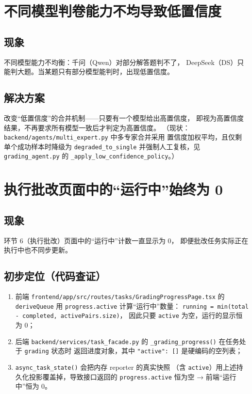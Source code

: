\documentclass[12pt,a4paper]{ctexart}
\begin{document}
\section{不同模型判卷能力不均导致低置信度}

\subsection{现象}
不同模型能力不均衡：千问（Qwen）对部分解答题判不了，
DeepSeek（DS）只能判大题。当某题只有部分模型能判时，出现低置信度。

\subsection{解决方案}
改变“低置信度”的合并机制——只要有一个模型给出高置信度，
即视为高置信度结果，不再要求所有模型一致后才判定为高置信度。
（现状：\texttt{backend/agents/multi\_expert.py} 中多专家合并采用
置信度加权平均，且仅剩单个成功样本时降级为
\texttt{degraded\_to\_single} 并强制人工复核，见
\texttt{grading\_agent.py} 的 \texttt{\_apply\_low\_confidence\_policy}。）

\section{执行批改页面中的“运行中”始终为 0}

\subsection{现象}
环节 6（执行批改）页面中的“运行中”计数一直显示为 0，
即便批改任务实际正在执行中也不同步更新。

\subsection{初步定位（代码查证）}
\begin{enumerate}[leftmargin=2em,label=(\arabic*)]
  \item 前端 \texttt{frontend/app/src/routes/tasks/GradingProgressPage.tsx}
        的 \texttt{deriveQueue} 用 \texttt{progress.active} 计算“运行中”数量：
        \texttt{running = min(total - completed, activePairs.size)}，
        因此只要 \texttt{active} 为空，运行的显示恒为 0；
  \item 后端 \texttt{backend/services/task\_facade.py} 的
        \texttt{\_grading\_progress()} 在任务处于 \texttt{grading} 状态时
        返回进度对象，其中 \texttt{"active": []} 是硬编码的空列表；
  \item \texttt{async\_task\_state()} 会把内存 reporter 的真实快照
        （含 \texttt{active}）用上述持久化投影覆盖掉，导致接口返回的
        \texttt{progress.active} 恒为空 → 前端“运行中”恒为 0。
\end{enumerate}
\end{document}
